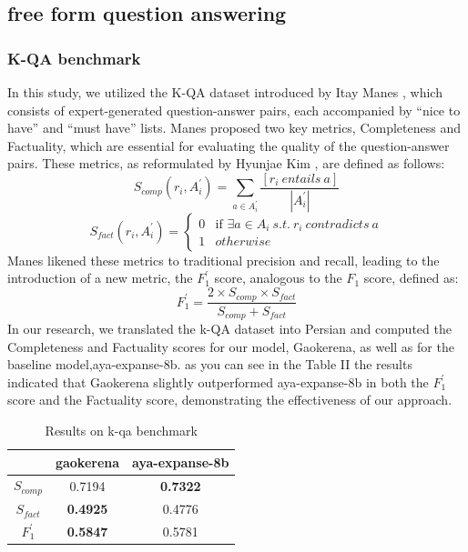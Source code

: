 \documentclass[conference]{IEEEtran}
\begin{document}
\subsection{free form question answering}
\subsubsection{K-QA benchmark}
In this study, we utilized the K-QA dataset introduced by Itay Manes
\cite{b18}
, which consists of expert-generated question-answer pairs, each accompanied by “nice to have” and “must have” lists. Manes proposed two key metrics, Completeness and Factuality, which are essential for evaluating the quality of the question-answer pairs. These metrics, as reformulated by Hyunjae Kim
\cite{b8}
, are defined as follows:  
\[
S_{comp}(r_i,A_i^{\prime}) =  \sum_{a \in A_i^{\prime}} \frac{[r_i \: entails \: a]}{|A_i^{\prime}|}
\]
\[
S_{fact}(r_i,A_i^{\prime}) = 
\begin{cases} 
	0 & \text{if } \exists a \in A_i \: s.t.  \: r_i \: contradicts \: a\\ 
	1 & otherwise
\end{cases}
\]
Manes likened these metrics to traditional precision and recall, leading to the introduction of a new metric, the $F_{1}^{\prime}$ score, analogous to the $F_{1}$ score, defined as: 
\[
F_{1}^{\prime} = \frac{2 \times S_{comp} \times S_{fact}}{S_{comp} + S_{fact}}
\]
In our research, we translated the k-QA dataset into Persian and computed the Completeness and Factuality scores for our model, Gaokerena, as well as for the baseline model,aya-expanse-8b. as you can see in the Table II the results indicated that Gaokerena slightly outperformed aya-expanse-8b in both the $F_{1}^{\prime}$ score and the Factuality score, demonstrating the effectiveness of our approach.

\begin{table}[ht]
	\centering
	\caption{Results on k-qa benchmark}
	\begin{tabular}{|c|c|c|} %
		\hline
		\textbf{} & \textbf{gaokerena} & \textbf{aya-expanse-8b} \\ 
		\hline
		$S_{comp}$ & 0.7194 & \textbf{0.7322} \\ 
		\hline
		$S_{fact}$ & \textbf{0.4925} & 0.4776 \\ 
		\hline
		$F_{1}^{\prime}$ & \textbf{0.5847} & 0.5781 \\ 
		\hline
	\end{tabular}
	\label{tab:model_accuracy}
\end{table}
\end{document}
